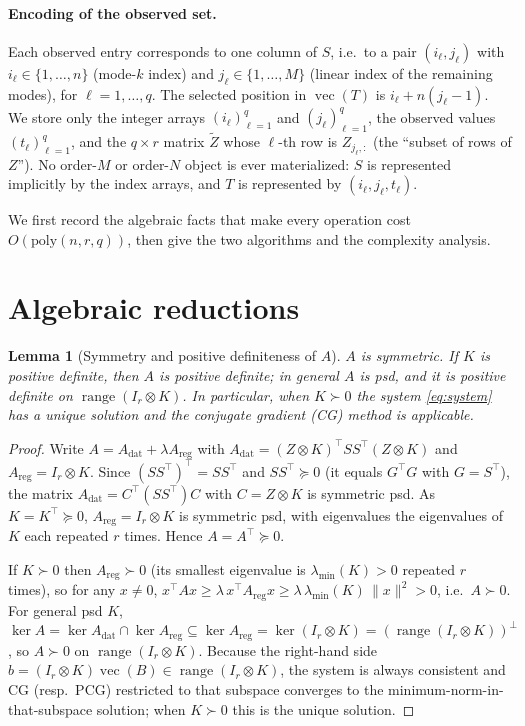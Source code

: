 \documentclass[12pt]{article}
\DeclareMathOperator{\vecop}{vec}
\newtheorem{lemma}{Lemma}
\theoremstyle{remark}
\begin{document}
\paragraph{Encoding of the observed set.} Each observed entry corresponds to one column of $S$, i.e.\ to a pair $(i_\ell,j_\ell)$ with $i_\ell\in\{1,\dots,n\}$ (mode-$k$ index) and $j_\ell\in\{1,\dots,M\}$ (linear index of the remaining modes), for $\ell=1,\dots,q$. The selected position in $\vecop(T)$ is $i_\ell + n(j_\ell-1)$. We store only the integer arrays $(i_\ell)_{\ell=1}^q$ and $(j_\ell)_{\ell=1}^q$, the observed values $(t_\ell)_{\ell=1}^q$, and the $q\times r$ matrix $\tilde Z$ whose $\ell$-th row is $Z_{j_\ell,:}$ (the ``subset of rows of $Z$''). No order-$M$ or order-$N$ object is ever materialized: $S$ is represented implicitly by the index arrays, and $T$ is represented by $(i_\ell,j_\ell,t_\ell)$.

\medskip
We first record the algebraic facts that make every operation cost $O(\mathrm{poly}(n,r,q))$, then give the two algorithms and the complexity analysis.

\section{Algebraic reductions}

\begin{lemma}[Symmetry and positive definiteness of $A$]\label{lem:spd}
$A$ is symmetric. If $K$ is positive definite, then $A$ is positive definite; in general $A$ is psd, and it is positive definite on $\operatorname{range}(I_r\otimes K)$. In particular, when $K\succ0$ the system \eqref{eq:system} has a unique solution and the conjugate gradient (CG) method is applicable.
\end{lemma}

\begin{proof}
Write $A = A_{\mathrm{dat}} + \lambda A_{\mathrm{reg}}$ with
$A_{\mathrm{dat}} = (Z\otimes K)^{\!\top}SS^{\!\top}(Z\otimes K)$ and $A_{\mathrm{reg}} = I_r\otimes K$.
Since $(SS^{\!\top})^{\!\top}=SS^{\!\top}$ and $SS^{\!\top}\succeq0$ (it equals $G^{\!\top}G$ with $G=S^{\!\top}$), the matrix $A_{\mathrm{dat}}=C^{\!\top}(SS^{\!\top})C$ with $C=Z\otimes K$ is symmetric psd. As $K=K^{\!\top}\succeq0$, $A_{\mathrm{reg}}=I_r\otimes K$ is symmetric psd, with eigenvalues the eigenvalues of $K$ each repeated $r$ times. Hence $A=A^{\!\top}\succeq0$.

If $K\succ0$ then $A_{\mathrm{reg}}\succ0$ (its smallest eigenvalue is $\lambda_{\min}(K)>0$ repeated $r$ times), so for any $x\neq0$,
$x^{\!\top}Ax \ge \lambda\, x^{\!\top}A_{\mathrm{reg}}x \ge \lambda\,\lambda_{\min}(K)\,\|x\|^2>0$, i.e.\ $A\succ0$.
For general psd $K$, $\ker A = \ker A_{\mathrm{dat}}\cap\ker A_{\mathrm{reg}}\subseteq\ker A_{\mathrm{reg}} = \ker(I_r\otimes K) = (\operatorname{range}(I_r\otimes K))^{\perp}$, so $A\succ0$ on $\operatorname{range}(I_r\otimes K)$. Because the right-hand side $b=(I_r\otimes K)\vecop(B)\in\operatorname{range}(I_r\otimes K)$, the system is always consistent and CG (resp.\ PCG) restricted to that subspace converges to the minimum-norm-in-that-subspace solution; when $K\succ0$ this is the unique solution.
\end{proof}
\end{document}
